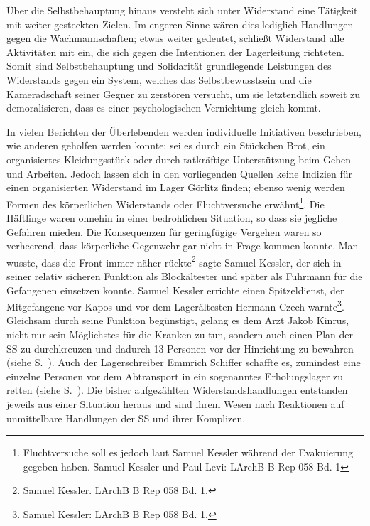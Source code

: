 Über die Selbstbehauptung hinaus versteht sich unter Widerstand eine Tätigkeit mit weiter gesteckten Zielen. Im engeren Sinne wären dies lediglich Handlungen gegen die Wachmannschaften; etwas weiter gedeutet, schließt Widerstand alle Aktivitäten mit ein, die sich gegen die Intentionen der Lagerleitung richteten. Somit sind Selbstbehauptung und Solidarität grundlegende Leistungen des Widerstands gegen ein System, welches das Selbstbewusstsein und die Kameradschaft seiner Gegner zu zerstören versucht, um sie letztendlich soweit zu demoralisieren, dass es einer psychologischen Vernichtung gleich kommt.

In vielen Berichten der Überlebenden werden individuelle Initiativen beschrieben, wie anderen geholfen werden konnte; sei es durch ein Stückchen Brot, ein organisiertes Kleidungsstück oder durch tatkräftige Unterstützung beim Gehen und Arbeiten. Jedoch lassen sich in den vorliegenden Quellen keine Indizien für einen organisierten Widerstand im Lager Görlitz finden; ebenso wenig werden Formen des körperlichen Widerstands oder Fluchtversuche erwähnt\footnote{Fluchtversuche soll es jedoch laut Samuel Kessler während der Evakuierung gegeben haben. Samuel Kessler und Paul Levi: LArchB B Rep 058 Bd. 1}. Die Häftlinge waren ohnehin in einer bedrohlichen Situation, so dass sie jegliche Gefahren mieden. Die Konsequenzen für geringfügige Vergehen waren so verheerend, dass körperliche Gegenwehr gar nicht in Frage kommen konnte. \glqq Man wusste, dass die Front immer näher rückte\grqq\footnote{Samuel Kessler. LArchB B Rep 058 Bd. 1.} sagte Samuel Kessler, der sich in seiner relativ sicheren Funktion als Blockältester und später als Fuhrmann für die Gefangenen einsetzen konnte. Samuel Kessler errichte einen Spitzeldienst, der Mitgefangene vor Kapos und vor dem Lagerältesten Hermann Czech warnte\footnote{Samuel Kessler: LArchB B Rep 058 Bd. 1.}. Gleichsam durch seine Funktion begünstigt, gelang es dem Arzt Jakob Kinrus, nicht nur sein Möglichstes für die Kranken zu tun, sondern auch einen Plan der SS zu durchkreuzen und dadurch 13 Personen vor der Hinrichtung zu bewahren (siehe S.~\pageref{widerstand_kinrus}). Auch der Lagerschreiber Emmrich Schiffer schaffte es, zumindest eine einzelne Personen vor dem Abtransport in ein sogenanntes Erholungslager zu retten (siehe S.~\pageref{widerstand_schiffer}). Die bisher aufgezählten Widerstandshandlungen entstanden jeweils aus einer Situation heraus und sind ihrem Wesen nach Reaktionen auf unmittelbare Handlungen der SS und ihrer Komplizen.

